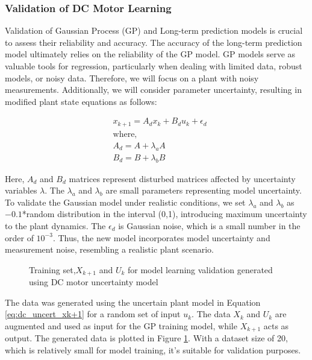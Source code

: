 \subsubsection{Validation of DC Motor Learning}

Validation of Gaussian Process (GP) and Long-term prediction models is crucial to assess their reliability and accuracy. The accuracy of the long-term prediction model ultimately relies on the reliability of the GP model. GP models serve as valuable tools for regression, particularly when dealing with limited data, robust models, or noisy data. Therefore, we will focus on a plant with noisy measurements. Additionally, we will consider parameter uncertainty\cite{dulau2016dc}, resulting in modified plant state equations as follows:

\begin{equation} \label{eq:dc_uncert_xk+1}
\begin{aligned}
        & x_{k+1} = A_d x_k + B_d u_k + \epsilon_d\\
    & \text{where,} \\
    & A_d = A + \lambda_a A \\
    & B_d = B + \lambda_b B
\end{aligned}
\end{equation}

Here, $A_d$ and $B_d$ matrices represent disturbed matrices affected by uncertainty variables $\lambda$. The $\lambda_a$ and $\lambda_b$ are small parameters representing model uncertainty. To validate the Gaussian model under realistic conditions, we set $\lambda_a$ and $\lambda_b$ as $-0.1$*random distribution in the interval (0,1), introducing maximum uncertainty to the plant dynamics. The $\epsilon_d$ is Gaussian noise, which is a small number in the order of $10^{-3}$. Thus, the new model incorporates model uncertainty and measurement noise, resembling a realistic plant scenario.

\begin{figure}
    \centering
    
    \caption{Training set,$X_{k+1}$ and $U_k$ for model learning validation generated using DC motor uncertainty model}
    \label{fig:data_points_gp_test}
\end{figure}


The data was generated using the uncertain plant model in Equation \ref{eq:dc_uncert_xk+1} for a random set of input $u_k$. The data $X_k$ and $U_k$ are augmented and used as input for the GP training model, while $X_{k+1}$ acts as output. The generated data is plotted in Figure \ref{fig:data_points_gp_test}. With a dataset size of 20, which is relatively small for model training, it's suitable for validation purposes.

